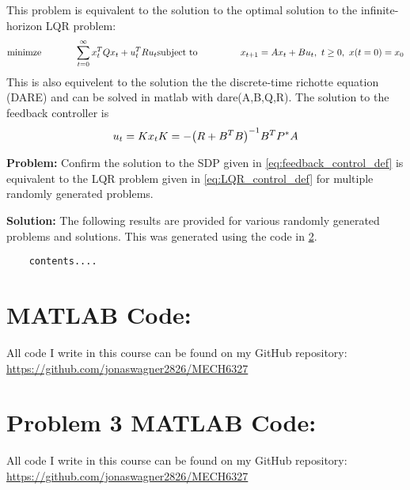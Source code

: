 \documentclass[letter]{article}
\begin{document}
This problem is equivalent to the solution to the optimal solution to the infinite-horizon LQR problem:
\begin{equation}\label{eq:LQR_control_def}
	\begin{aligned}
		\text{minimze} \hspace{0.5in}& \sum_{t=0}^\infty x_t^T Q x_t + u_t^T R u_t
		\text{subject to} \hspace{0.5in}
		& x_{t+1} = Ax_t + B u_t, \ t \geq 0, \ x(t=0) = x_0
	\end{aligned}
\end{equation}
This is also equivelent to the solution the the discrete-time richotte equation (DARE) and can be solved in matlab with dare(A,B,Q,R). The solution to the feedback controller is
\begin{equation}\label{eq:LQR_control_solution}
	u_t = K x_t\\
	K = -\qty(R + B^T B)^{-1} B^T P^* A
\end{equation}

\textbf{Problem:}
Confirm the solution to the SDP given in \eqref{eq:feedback_control_def} is equivalent to the LQR problem given in \eqref{eq:LQR_control_def} for multiple randomly generated problems.

\textbf{Solution:}
The following results are provided for various randomly generated problems and solutions. This was generated using the code in \appendixname \ref{apx:pblm3_matlab}.

\begin{Verbatim}
	contents....
\end{Verbatim}















\newpage
\appendix
\section{MATLAB Code:}\label{apx:matlab}
All code I write in this course can be found on my GitHub repository:\\
\href{https://github.com/jonaswagner2826/MECH6313}{https://github.com/jonaswagner2826/MECH6327}
%


\newpage
\section{Problem 3 MATLAB Code:}\label{apx:pblm3_matlab}
All code I write in this course can be found on my GitHub repository:\\
\href{https://github.com/jonaswagner2826/MECH6313}{https://github.com/jonaswagner2826/MECH6327}
%
\end{document}
